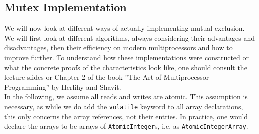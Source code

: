 \documentclass[main]{subfiles}
\begin{document}

\subsection{Mutex Implementation}
We will now look at different ways of actually implementing mutual exclusion. We will first look at different algorithms, always considering their advantages and disadvantages, then their efficiency on modern multiprocessors and how to improve further. To understand how these implementations were constructed or what the concrete proofs of the characteristics look like, one should consult the lecture slides or Chapter 2 of the book ''The Art of Multiprocessor Programming'' by Herlihy and Shavit.\\[3mm]
In the following, we assume all reads and writes are atomic. This assumption is necessary, as while we do add the \texttt{volatile} keyword to all array declarations, this only concerns the array references, not their entries. In practice, one would declare the arrays to be arrays of \texttt{AtomicInteger}s, i.e. as \texttt{AtomicIntegerArray}.
\end{document}
